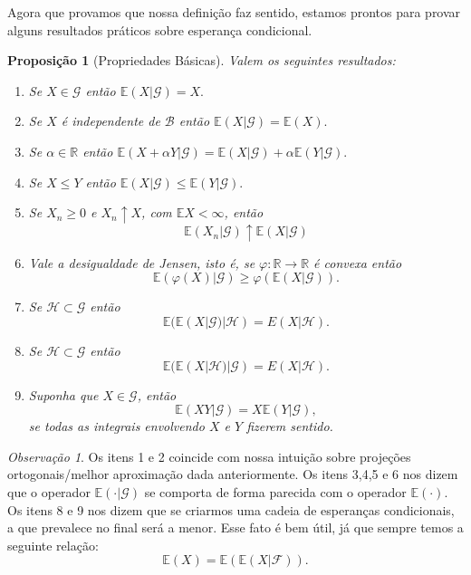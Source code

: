 \documentclass[12pt,a4paper,oneside]{book}
\newtheorem{proposition}[theorem]{Proposi\c{c}\~ao}
\theoremstyle{definition}
\theoremstyle{remark}
\newtheorem{remark}[theorem]{Observa\c{c}\~ao}
\numberwithin{equation}{section}
\newcommand{\R}{\mathbb{R}}
\newcommand{\E}{\mathbb{E}}
\begin{document}
Agora que provamos que nossa definição faz sentido, estamos prontos para provar alguns resultados práticos sobre esperança condicional.


\begin{proposition}[Propriedades Básicas]
Valem os seguintes resultados:
\begin{enumerate}
\item Se $X\in\mathcal{G}$ então $\E(X|\mathcal{G}) = X.$\label{condExpPropBasEX=X}
\item Se $X$ é independente de $\mathcal{B}$ então $\E(X|\mathcal{G}) = \E(X).$ 
\item Se $\alpha\in\R$ então $\E(X+\alpha Y|\mathcal{G}) = \E(X|\mathcal{G}) + \alpha\E(Y|\mathcal{G}).$
\item Se $X\leq Y$ então $\E(X|\mathcal{G})\leq \E(Y|\mathcal{G}).$
\item Se $X_n\geq 0$ e  $X_n\uparrow X$, com $\E X<\infty$, então
$$\E(X_n|\mathcal{G})\uparrow \E(X|\mathcal{G}) $$
\item  Vale a desigualdade de  Jensen, isto é, se $\varphi:\R\rightarrow \R$ é convexa então
$$\E(\varphi(X)|\mathcal{G}) \geq \varphi(\E(X|\mathcal{G})). $$\label{jensen-condit}
\item Se $\mathcal{H}\subset\mathcal{G}$ então
$$\E(\E(X|\mathcal{G})|\mathcal{H} )  = E(X|\mathcal{H}).$$
\item Se $\mathcal{H}\subset\mathcal{G}$ então
$$\E(\E(X|\mathcal{H})|\mathcal{G} )  = E(X|\mathcal{H}).$$
\item Suponha que $X\in \mathcal{G}$, então 
$$\E(XY|\mathcal{G}) = X\E(Y|\mathcal{G}), $$
se todas as integrais envolvendo $X$ e $Y$ fizerem sentido.

\end{enumerate}
\end{proposition}


\begin{tcolorbox}[colback = yellow!60]
\begin{remark}
Os itens 1 e 2 coincide com nossa intuição sobre projeções ortogonais/melhor aproximação dada anteriormente. Os itens 3,4,5 e 6 nos dizem que o operador $\E(\cdot|\mathcal{G})$ se comporta de forma parecida com o operador $\E(\cdot  )$.
Os itens 8 e 9 nos dizem que se criarmos uma cadeia de esperanças condicionais, a que prevalece no final será a menor. Esse fato é bem útil, já que sempre temos a seguinte relação:
$$\E(X) = \E(\E(X|\mathcal{F})).$$  
\end{remark}
\end{tcolorbox}
\end{document}
